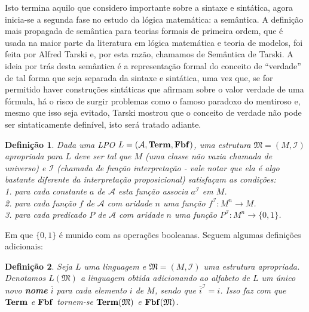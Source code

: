 \documentclass[11pt,a4paper]{article}
\newtheorem{mydef}{Definição}[section]
\theoremstyle{definition}
\begin{document}
Isto termina aquilo que considero importante sobre a sintaxe e sintática, agora inicia-se a segunda fase no estudo da lógica matemática: a semântica. A definição mais propagada de semântica para teorias formais de primeira ordem, que é usada na maior parte da literatura em lógica matemática e teoria de modelos, foi feita por Alfred Tarski e, por esta razão, chamamos de Semântica de Tarski. A ideia por trás desta semântica é a representação formal do conceito de ``verdade'' de tal forma que seja separada da sintaxe e sintática, uma vez que, se for permitido haver construções sintáticas que afirmam sobre o valor verdade de uma fórmula, há o risco de surgir problemas como o famoso paradoxo do mentiroso e, mesmo que isso seja evitado, Tarski mostrou que o conceito de verdade não pode ser sintaticamente definível, isto será tratado adiante. 

\begin{mydef}
	
	Dada uma LPO $L=(\mathcal{A},\textrm{\textbf{Term}},\textrm{\textbf{Fbf}})$, uma estrutura $\mathfrak{M}=(M,\mathscr{I})$ apropriada para $L$ deve ser tal que $M$ (uma classe não vazia chamada de universo) e $\mathscr{I}$ (chamada de função interpretação - vale notar que ela é algo bastante diferente da interpretação proposicional) satisfaçam as condições:\\
	
	1. para cada constante $a$ de $\mathcal{A}$ esta função associa $a^\mathscr{I}$ em $M$. \\
	
	2. para cada função $f$ de $\mathcal{A}$ com aridade $n$ uma função $f^\mathscr{I}:M^n\rightarrow M$. \\
	
	3. para cada predicado $P$ de $\mathcal{A}$ com aridade $n$ uma função $P^\mathscr{I}:M^n\rightarrow \{0,1\}$.
	
\end{mydef}

Em que $ \{0,1\}$ é munido com as operações booleanas. Seguem algumas definições adicionais:

\begin{mydef}
	
	Seja $L$ uma linguagem e $\mathfrak{M}=(M,\mathscr{I})$ uma estrutura apropriada. Denotamos $L(\mathfrak{M})$ a linguagem obtida adicionando ao alfabeto de $L$ um único novo \textbf{nome} $\overline{i}$ para cada elemento $i$ de $M$, sendo que $\overline{i}^\mathscr{I}=i$. Isso faz com que $\textrm{\textbf{Term}}$ e $\textrm{\textbf{Fbf}}$ tornem-se $\textrm{\textbf{Term}}(\mathfrak{M})$ e $\textrm{\textbf{Fbf}}(\mathfrak{M})$.
	
\end{mydef}
\end{document}

